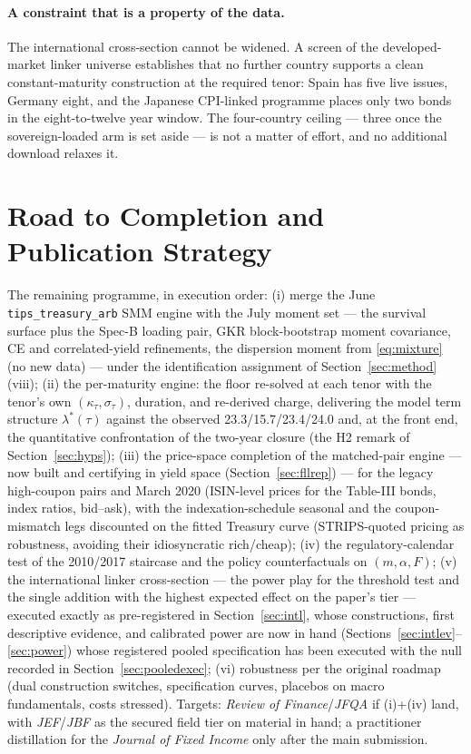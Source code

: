 \documentclass[11pt]{article}
\begin{document}
\paragraph{A constraint that is a property of the data.} The international cross-section cannot be
widened. A screen of the developed-market linker universe establishes that no further country
supports a clean constant-maturity construction at the required tenor: Spain has five live issues,
Germany eight, and the Japanese CPI-linked programme places only two bonds in the eight-to-twelve
year window. The four-country ceiling --- three once the sovereign-loaded arm is set aside --- is
not a matter of effort, and no additional download relaxes it.

\section{Road to Completion and Publication Strategy}

The remaining programme, in execution order: (i) merge the June \texttt{tips\_treasury\_arb} SMM engine with the July moment set --- the survival surface plus the Spec-B loading pair, GKR block-bootstrap moment covariance, CE and correlated-yield refinements, the dispersion moment from \eqref{eq:mixture} (no new data) --- under the identification assignment of Section~\ref{sec:method}(viii); (ii) the per-maturity engine: the floor re-solved at each tenor with the tenor's own $(\kappa_\tau,\sigma_\tau)$, duration, and re-derived charge, delivering the model term structure $\lambda^*(\tau)$ against the observed 23.3/15.7/23.4/24.0 and, at the front end, the quantitative confrontation of the two-year closure (the H2 remark of Section~\ref{sec:hyps}); (iii) the price-space completion of the matched-pair engine --- now built and certifying in yield space (Section~\ref{sec:fllrep}) --- for the legacy high-coupon pairs and March 2020 (ISIN-level prices for the Table-III bonds, index ratios, bid--ask), with the indexation-schedule seasonal and the coupon-mismatch legs discounted on the fitted Treasury curve (STRIPS-quoted pricing as robustness, avoiding their idiosyncratic rich/cheap); (iv) the regulatory-calendar test of the 2010/2017 staircase and the policy counterfactuals on $(m,\alpha,F)$; (v) the international linker cross-section --- the power play for the threshold test and the single addition with the highest expected effect on the paper's tier --- executed exactly as pre-registered in Section~\ref{sec:intl}, whose constructions, first descriptive evidence, and calibrated power are now in hand (Sections~\ref{sec:intlev}--\ref{sec:power}) whose registered pooled specification has been executed with the null recorded in Section~\ref{sec:pooledexec}; (vi) robustness per the original roadmap (dual construction switches, specification curves, placebos on macro fundamentals, costs stressed). Targets: \emph{Review of Finance}/\emph{JFQA} if (i)+(iv) land, with \emph{JEF}/\emph{JBF} as the secured field tier on material in hand; a practitioner distillation for the \emph{Journal of Fixed Income} only after the main submission.
\end{document}
